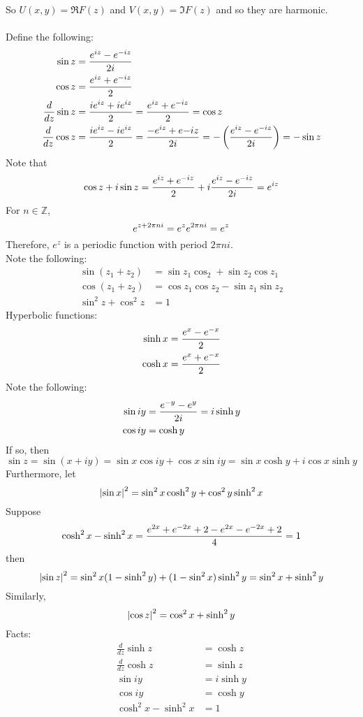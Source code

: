 \documentclass[12pt]{article}
\begin{document}
So $U(x,y) = \Re{F(z)}$ and $V(x,y) = \Im{F(z)}$ and so they are harmonic. \\~\\
Define the following: $$ \begin{aligned} \sin z &= \frac{e^{iz} - e^{-iz}}{2i}\\  \cos z &= \frac{e^{iz} + e^{-iz}}{2} \\ \frac{d}{dz} \sin z &= \frac{ie^{iz} + ie^{iz}}{2} = \frac{e^{iz} + e^{-iz}}{2} = \cos z \\ \frac{d}{dz} \cos z &= \frac{ie^{iz} - ie^{iz}}{2} = \frac{-e^{iz} + e{-iz}}{2i} = -\left( \frac{e^{iz} - e^{-iz}}{2i}\right) = -\sin z \end{aligned} $$ 
Note that $$\cos z + i\sin z = \frac{e^{iz} + e^{-iz}}{2} + i\frac{e^{iz} - e^{-iz}}{2i}  = e^{iz} $$ 
For $n \in \mathbb{Z}$, $$ e^{z+2\pi ni} = e^{z} e^{2\pi ni} = e^{z} $$ 
Therefore, $e^z$ is a periodic function with period $2\pi ni$. \\
Note the following: $$ \begin{aligned} \sin(z_1 + z_2) &= \sin z_1\cos _2 + \sin z_2 \cos z_1 \\ \cos(z_1 + z_2) &= \cos z_1\cos z_2 - \sin z_1 \sin z_2 \\ \sin^2 z + \cos^2 z &= 1 \end{aligned} $$ 
Hyperbolic functions: $$ \begin{aligned} \sinh x &= \frac{e^{x} - e^{-x}}{2} \\ \cosh x &= \frac{e^{x} + e^{-x}}{2} \end{aligned} $$
 Note the following: $$ \begin{aligned} \sin iy &= \frac{e^{-y} - e^{y}}{2i} = i\sinh y \\ \cos iy &= \cosh y \end{aligned} $$ 
 If so, then $$\sin z = \sin (x+iy) = \sin x \cos iy + \cos x \sin iy = \sin x \cosh y + i\cos x \sinh y $$ 
 Furthermore, let $$\abs{\sin x}^2 = \sin^2 x \cosh^2 y + \cos^2 y \sinh^2 x $$
 Suppose $$ \cosh^2 x - \sinh^2 x = \frac{e^{2x} + e^{-2x} + 2 - e^{2x} - e^{-2x} + 2}{4} = 1$$ then $$ \abs{\sin z}^2 = \sin^2 x (1 - \sinh^2 y) + (1 - \sin^2 x)\sinh^2 y= \sin^2 x + \sinh^2 y $$ 
 Similarly, $$\abs{\cos z}^2 = \cos^2 x + \sinh^2 y $$ 
 Facts: $$ \begin{aligned} \frac{d}{dz} \sinh z &= \cosh z \\ \frac{d}{dz} \cosh z &= \sinh z \\ \sin iy &= i\sinh y \\ \cos iy &= \cosh y \\ \cosh^2 x - \sinh^2 x &= 1 \end{aligned} $$ 
\end{document}
